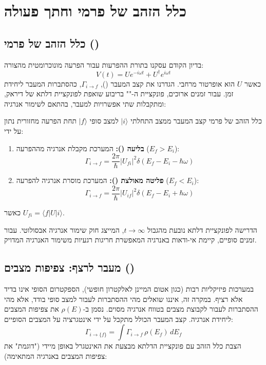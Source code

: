 \section{כלל הזהב של פרמי וחתך פעולה}

\subsection{כלל הזהב של פרמי ()}

בדיון הקודם עסקנו בתורת ההפרעות עבור הפרעה מונוכרומטית מהצורה:
\[
V(t) = U e^{-i\omega t} + U^\dagger e^{i\omega t}
\]
כאשר $U$ הוא אופרטור מרחבי. הגדרנו את קצב המעבר (), $\Gamma_{i \to f}$, כהסתברות המעבר ליחידת זמן. עבור זמנים ארוכים, פונקציית ה-"" בריבוע שואפת לפונקציית דלתא של דיראק, ומתקבלות שתי אפשרויות למעבר, בהתאם לשימור אנרגיה:

\begin{theorembox}{כלל הזהב של פרמי}
קצב המעבר ממצב התחלתי $|i\rangle$ למצב סופי $|f\rangle$ תחת הפרעה מחזורית נתון על ידי:
\begin{enumerate}
    \item \textbf{בליעה ():} המערכת מקבלת אנרגיה מההפרעה ($E_f > E_i$):
    \[
    \Gamma_{i \to f} = \frac{2\pi}{\hbar} |U_{fi}|^2 \delta(E_f - E_i - \hbar\omega)
    \]
    \item \textbf{פליטה מאולצת ():} המערכת מוסרת אנרגיה להפרעה ($E_f < E_i$):
    \[
    \Gamma_{i \to f} = \frac{2\pi}{\hbar} |U_{if}|^2 \delta(E_f - E_i + \hbar\omega)
    \]
\end{enumerate}
כאשר $U_{fi} = \langle f | U | i \rangle$.
\end{theorembox}

הדרישה לפונקציית דלתא נובעת מהגבול $t \to \infty$, המייצג חוק שימור אנרגיה אבסולוטי. עבור זמנים סופיים, קיימת אי-ודאות באנרגיה המאפשרת חריגות רגעיות משימור האנרגיה המדויק.

\subsection{מעבר לרצף: צפיפות מצבים ()}

במערכות פיזיקליות רבות (כגון אטום המיינן לאלקטרון חופשי), הספקטרום הסופי אינו בדיד אלא רציף. במקרה זה, איננו שואלים מהי ההסתברות לעבור למצב סופי בודד, אלא מהי ההסתברות לעבור לקבוצת מצבים בטווח אנרגיה מסוים.
נסמן ב-$\rho(E)$ את צפיפות המצבים ליחידת אנרגיה. קצב המעבר הכולל מתקבל על ידי אינטגרציה על המצבים הסופיים:
\[
\Gamma_{i \to \{f\}} = \int \Gamma_{i \to f} \, \rho(E_f) \, dE_f
\]
הצבת כלל הזהב עם פונקציית הדלתא מבצעת את האינטגרל באופן מיידי ("דוגמת" את צפיפות המצבים באנרגיה המתאימה):

